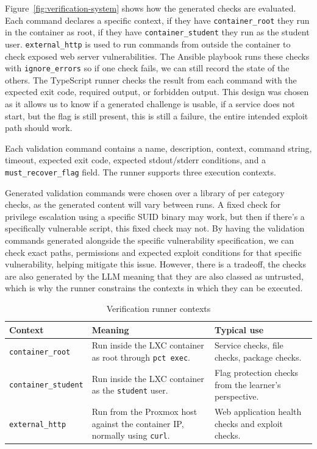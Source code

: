 Figure~\ref{fig:verification-system} shows how the generated checks are evaluated. Each command declares a specific context, if they have \lstinline{container_root} they run in the container as root, if they have \lstinline{container_student} they run as the student user. \lstinline{external_http} is used to run commands from outside the container to check exposed web server vulnerabilities. The Ansible playbook runs these checks with \lstinline{ignore_errors} so if one check fails, we can still record the state of the others. The TypeScript runner checks the result from each command with the expected exit code, required output, or forbidden output. This design was chosen as it allows us to know if a generated challenge is usable, if a service does not start, but the flag is still present, this is still a failure, the entire intended exploit path should work.

Each validation command contains a name, description, context, command string, timeout, expected exit code, expected stdout/stderr conditions, and a \lstinline|must_recover_flag| field. The runner supports three execution contexts.

Generated validation commands were chosen over a library of per category checks, as the generated content will vary between runs. A fixed check for privilege escalation using a specific SUID binary may work, but then if there's a specifically vulnerable script, this fixed check may not. By having the validation commands generated alongside the specific vulnerability specification, we can check exact paths, permissions and expected exploit conditions for that specific vulnerability, helping mitigate this issue. However, there is a tradeoff, the checks are also generated by the LLM meaning that they are also classed as untrusted, which is why the runner constrains the contexts in which they can be executed.

\begin{table}[H]
	\centering
	\caption{Verification runner contexts}
	\label{tab:verification-runner-context}
	\begin{tabular}{|>{\raggedright\arraybackslash}p{3.5cm}|p{5cm}|p{5cm}|}
		\hline
		\textbf{Context}              & \textbf{Meaning}                                                                     & \textbf{Typical use}                                   \\
		\hline
		\lstinline|container_root|    & Run inside the LXC container as root through \lstinline|pct exec|.                   & Service checks, file checks, package checks.           \\
		\hline
		\lstinline|container_student| & Run inside the LXC container as the \lstinline|student| user.                        & Flag protection checks from the learner's perspective. \\
		\hline
		\lstinline|external_http|     & Run from the Proxmox host against the container IP, normally using \lstinline|curl|. & Web application health checks and exploit checks.      \\
		\hline
	\end{tabular}
\end{table}


